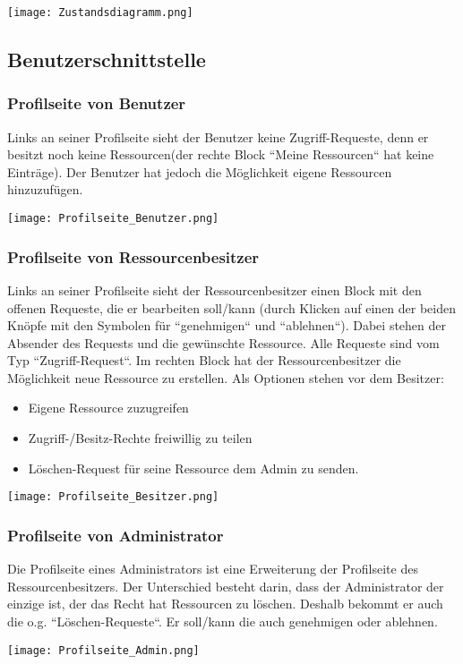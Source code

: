 \documentclass[parskip=full,11pt]{scrartcl}
\begin{document}
	\begin{center}
	\texttt{[image: Zustandsdiagramm.png]}
	\end{center}
	\newpage
\subsection{Benutzerschnittstelle}

\subsubsection*{Profilseite von Benutzer}
Links an seiner Profilseite sieht der Benutzer keine Zugriff-Requeste, denn er besitzt noch keine Ressourcen(der rechte Block ``Meine Ressourcen`` hat keine Einträge). Der Benutzer hat jedoch die Möglichkeit eigene Ressourcen hinzuzufügen.
	\begin{center}
	\texttt{[image: Profilseite\_Benutzer.png]}
	\end{center}
	
\subsubsection*{Profilseite von Ressourcenbesitzer}

Links an seiner Profilseite sieht der Ressourcenbesitzer einen Block mit den offenen Requeste, die er bearbeiten soll/kann (durch Klicken auf einen der beiden Knöpfe mit den Symbolen für ``genehmigen`` und ``ablehnen``). Dabei stehen der Absender des Requests und die gewünschte Ressource. Alle Requeste sind vom Typ ``Zugriff-Request``. Im rechten Block hat der Ressourcenbesitzer die Möglichkeit neue Ressource zu erstellen. Als Optionen stehen vor dem Besitzer:
\begin{itemize}
	\item Eigene Ressource zuzugreifen 
	\item Zugriff-/Besitz-Rechte freiwillig zu teilen 
	\item Löschen-Request für seine Ressource dem Admin zu senden.
\end{itemize} 

	\begin{center}
	\texttt{[image: Profilseite\_Besitzer.png]}
	\end{center}
	
\subsubsection*{Profilseite von Administrator}
Die Profilseite eines Administrators ist eine Erweiterung der Profilseite des Ressourcenbesitzers. Der Unterschied besteht darin, dass der Administrator der einzige ist, der das Recht hat Ressourcen zu löschen. Deshalb bekommt er auch die o.g. ``Löschen-Requeste``. Er soll/kann die auch genehmigen oder ablehnen.
	\begin{center}
	\texttt{[image: Profilseite\_Admin.png]}
	\end{center}
	
\end{document}
